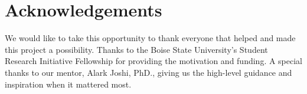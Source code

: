 \section{Acknowledgements}

We would like to take this opportunity to thank everyone that helped and made
this project a possibility. Thanks to the Boise State University's Student
Research Initiative Fellowship for providing the motivation and funding. A
special thanks to our mentor, Alark Joshi, PhD., giving us the high-level
guidance and inspiration when it mattered most.
